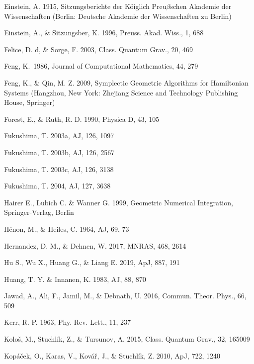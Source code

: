 \documentclass[preprint2]{aastex}
\begin{document}
\begin{thebibliography}{}
  Einstein, A. 1915, Sitzungsberichte der K\"{o}iglich Preu$\beta$schen Akademie der
Wissenschaften (Berlin: Deutsche Akademie der Wissenschaften zu
Berlin)

 Einstein, A., \& Sitzungsber, K. 1996, Preuss. Akad. Wiss., 1, 688

 Felice, D. d, \& Sorge, F. 2003, Class. Quantum Grav., 20, 469

 Feng, K.\ 1986, Journal of Computational Mathematics, 44, 279

 Feng, K., \& Qin, M. Z. 2009, Symplectic Geometric Algorithms for
Hamiltonian Systems (Hangzhou, New York: Zhejiang Science and
Technology Publishing House, Springer)

 Forest, E., \& Ruth, R. D. 1990, Physica D, 43, 105

 Fukushima, T. 2003a, AJ, 126, 1097

 Fukushima, T. 2003b, AJ, 126, 2567

 Fukushima, T. 2003c, AJ, 126, 3138

 Fukushima, T. 2004, AJ, 127, 3638

 Hairer E., Lubich C. \& Wanner G. 1999, Geometric Numerical Integration,
Springer-Verlag, Berlin

 H\'{e}non, M., \& Heiles, C. 1964, AJ, 69, 73

 Hernandez, D. M., \& Dehnen, W. 2017, MNRAS, 468, 2614

 Hu S., Wu X., Huang G., \& Liang E. 2019,
ApJ, 887, 191

 Huang, T. Y. \& Innanen, K. 1983, AJ, 88, 870

 Jawad, A., Ali, F., Jamil, M., \& Debnath, U. 2016, Commun. Theor. Phys., 66, 509

 Kerr, R. P. 1963, Phy. Rev. Lett., 11, 237

 Kolo\v{s}, M., Stuchl\'{i}k, Z., \& Tursunov, A. 2015, Class. Quantum Grav., 32,
165009

 Kop\'{a}\v{c}ek, O., Karas, V.,  Kov\'{a}\v{r}, J., \&
Stuchl\'{i}k, Z. 2010, ApJ, 722, 1240


\end{thebibliography}
\end{document}
